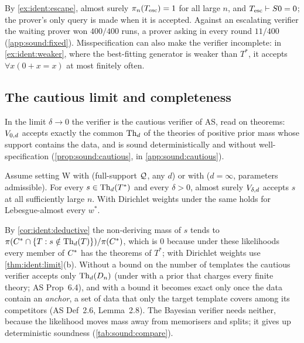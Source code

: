 \noindent By \cref{ex:ident:escape}, almost surely $\pi_n(T_{\mathrm{esc}})=1$ for all large $n$, and $T_{\mathrm{esc}}\vdash S0=0$; the prover's only query is made when it is accepted. Against an escalating verifier the waiting prover won $400/400$ runs, a prover asking in every round $11/400$ (\cref{app:sound:fixed}). Misspecification can also make the verifier incomplete: in \cref{ex:ident:weaker}, where the best-fitting generator is weaker than $T^*$, it accepts $\forall x(0+x=x)$ at most finitely often.

\subsection{The cautious limit and completeness}\label{sec:sound:cautious}

In the limit $\delta\to0$ the verifier is the cautious verifier of AS, read on theorems: $V_{0,d}$ accepts exactly the common $\mathrm{Th}_d$ of the theories of positive prior mass whose support contains the data, and is sound deterministically and without well-specification (\cref{prop:sound:cautious}, in \cref{app:sound:cautious}).

\begin{proposition}\label{prop:sound:complete}
Assume setting W with \Lzero{} (full-support $\mathcal{Q}$, any $d$) or with \Lone{} ($d=\infty$, parameters admissible). For every $s\in\mathrm{Th}_d(T^*)$ and every $\delta>0$, almost surely $V_{\delta,d}$ accepts $s$ at all sufficiently large $n$. With Dirichlet weights under \Lzero{} the same holds for Lebesgue-almost every $w^*$.
\end{proposition}

\noindent By \cref{cor:ident:deductive} the non-deriving mass of $s$ tends to $\pi(C^{*}\cap\{T:s\notin\mathrm{Th}_d(T)\})/\pi(C^{*})$, which is $0$ because under these likelihoods every member of $C^{*}$ has the theorems of $T^*$; with Dirichlet weights use \cref{thm:ident:limit}(b).
Without a bound on the number of templates the cautious verifier accepts only $\mathrm{Th}_d(D_n)$ (under \Lzero{} with a prior that charges every finite theory; AS Prop~6.4), and with a bound it becomes exact only once the data contain an \emph{anchor}, a set of data that only the target template covers among its competitors (AS Def~2.6, Lemma~2.8). The Bayesian verifier needs neither, because the likelihood moves mass away from memorisers and splits; it gives up deterministic soundness (\cref{tab:sound:compare}).

